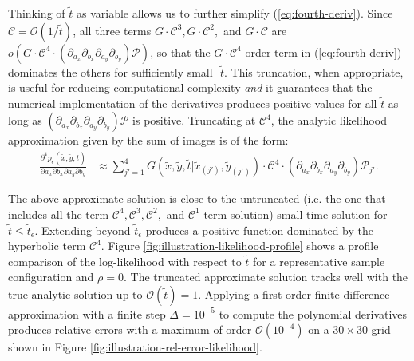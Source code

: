 Thinking of $\tilde{t}$ as variable allows us to further simplify
(\ref{eq:fourth-deriv}). Since
$\mathcal{C} = \mathcal{O}(1/\tilde{t})$, all three terms
$G\cdot \mathcal{C}^3, G\cdot \mathcal{C}^2,$ and $G\cdot \mathcal{C}$
are
$o\left( G\cdot \mathcal{C}^4 \cdot \left(\partial_{a_x}\partial_{b_x}
    \partial_{a_y}\partial_{b_y} \right)\mathcal{P} \right)$, so that
the $G\cdot \mathcal{C}^4$ order term in (\ref{eq:fourth-deriv})
dominates the others for sufficiently small $\,\,\tilde{t}$. This
truncation, when appropriate, is useful for reducing computational
complexity \textit{and} it guarantees that the numerical
implementation of the derivatives produces positive values for all
$\tilde{t}$ as long as
$\left(\partial_{a_x}\partial_{b_x} \partial_{a_y}\partial_{b_y}
\right)\mathcal{P}$ is positive. Truncating at $\mathcal{C}^4$, the
analytic likelihood approximation given by the sum of images is of the
form:
\begin{align}
  \frac{\partial^4 p_\epsilon(\tilde{x}, \tilde{y}, \tilde{t})}{\partial a_x
  \partial b_x \partial a_y \partial b_y} &\approx \sum_{j'=1}^{4} G(\tilde{x},\tilde{y},\tilde{t}|\tilde{x}_{(j')},\tilde{y}_{(j')}) \cdot \mathcal{C}^4 \cdot \left(\partial_{a_x}\partial_{b_x} \partial_{a_y}\partial_{b_y} \right)\mathcal{P}_{j'}. \label{eq:truncated-approx}
\end{align}

The above approximate solution is close to the untruncated (i.e. the
one that includes all the term
$\mathcal{C}^4, \mathcal{C}^3, \mathcal{C}^2,$ and $\mathcal{C}^1$
term solution) small-time solution for
$\tilde{t} \leq \tilde{t}_\epsilon$. Extending beyond
$\tilde{t}_\epsilon$ produces a positive function dominated by the
hyperbolic term $\mathcal{C}^4$. Figure
\ref{fig:illustration-likelihood-profile} shows a profile comparison
of the log-likelihood with respect to $\tilde{t}$ for a representative
sample configuration and $\rho=0$. The truncated approximate solution
tracks well with the true analytic solution up to
$\mathcal{O}(\tilde{t}) = 1$. Applying a first-order finite difference
approximation with a finite step $\Delta = 10^{-5}$ to compute the
polynomial derivatives produces relative errors with a maximum of
order $\mathcal{O}(10^{-4})$ on a $30 \times 30$ grid shown in Figure
\ref{fig:illustration-rel-error-likelihood}.





